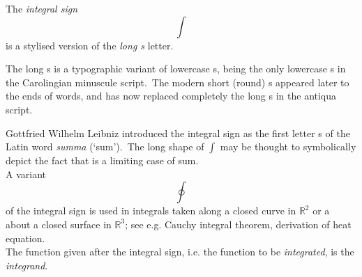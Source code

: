 \documentclass[12pt]{article}
\theoremstyle{definition}
\begin{document}
The {\em integral sign}
                               $$\int$$
is a stylised version of the {\em long s} letter.

The long s is a typographic variant of lowercase s, being the only lowercase s in the Carolingian minuscule script.\, The modern short (round) s appeared later to the ends of words, and has now replaced completely the long s in the antiqua script.

Gottfried Wilhelm Leibniz introduced the integral sign as the first letter s of the Latin word {\em summa} (`sum').\, The long shape of $\displaystyle\int$ may be thought to symbolically depict the fact that  is a limiting case of sum.\\

A variant
$$\oint$$
of the integral sign is used in integrals taken along a closed curve in $\mathbb{R}^2$ or a about a closed surface in $\mathbb{R}^3$; see e.g. Cauchy integral theorem, derivation of heat equation.\\

The function given after the integral sign, i.e. the function to be {\em integrated}, is the {\em integrand}.
\end{document}
